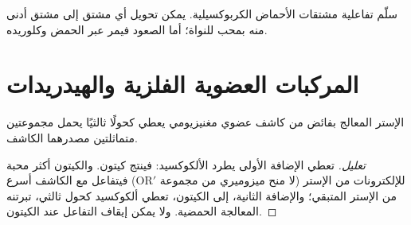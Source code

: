 \begin{omfigure}

{\small سلّم تفاعلية مشتقات الأحماض الكربوكسيلية. يمكن تحويل أي مشتق إلى
مشتق أدنى منه بمحب للنواة؛ أما الصعود فيمر عبر الحمض وكلوريده.}
\end{omfigure}

\section{المركبات العضوية الفلزية والهيدريدات}

\begin{proposition}\label{prop:b2:acyl-substitution:grignard-ester}
الإستر المعالج بفائض من كاشف عضوي مغنيزيومي يعطي كحولًا ثالثيًا يحمل مجموعتين
متماثلتين مصدرهما الكاشف.
\end{proposition}

\begin{proof}[تعليل]
تعطي الإضافة الأولى  يطرد الألكوكسيد: فينتج كيتون. والكيتون
أكثر محبة للإلكترونات من الإستر (لا منح ميزوميري من مجموعة $\mathrm{OR'}$) فيتفاعل مع
الكاشف أسرع من الإستر المتبقي؛ والإضافة الثانية، إلى الكيتون، تعطي ألكوكسيد
كحول ثالثي، تبرتنه المعالجة الحمضية. ولا يمكن إيقاف التفاعل عند الكيتون.
\end{proof}

